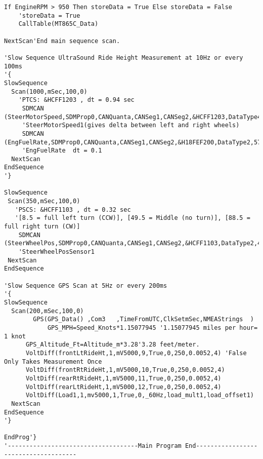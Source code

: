 \begin{lstlisting}[basicstyle=\tiny]
    If EngineRPM > 950 Then storeData = True Else storeData = False
    'storeData = True 
    CallTable(MT865C_Data)
      
NextScan'End main sequence scan.
		
'Slow Sequence UltraSound Ride Height Measurement at 10Hz or every 100ms
'{
SlowSequence
  Scan(1000,mSec,100,0)
    'PTCS: &HCFF1203 , dt = 0.94 sec
     SDMCAN (SteerMotorSpeed,SDMProp0,CANQuanta,CANSeg1,CANSeg2,&HCFF1203,DataType4,57,16,1,1,0) 
     'SteerMotorSpeed1(gives delta between left and right wheels)
     SDMCAN (EngFuelRate,SDMProp0,CANQuanta,CANSeg1,CANSeg2,&H18FEF200,DataType2,57,16,1,0.05,0)
     'EngFuelRate  dt = 0.1
  NextScan
EndSequence
'}

SlowSequence
 Scan(350,mSec,100,0)
   'PSCS: &HCFF1103 , dt = 0.32 sec 
   '[8.5 = full left turn (CCW)], [49.5 = Middle (no turn)], [88.5 = full right turn (CW)]
    SDMCAN (SteerWheelPos,SDMProp0,CANQuanta,CANSeg1,CANSeg2,&HCFF1103,DataType2,49,8,1,0.5,0)
    'SteerWheelPosSensor1
 NextScan
EndSequence

'Slow Sequence GPS Scan at 5Hz or every 200ms
'{		
SlowSequence
  Scan(200,mSec,100,0)
    	GPS(GPS_Data() ,Com3   ,TimeFromUTC,ClkSetmSec,NMEAStrings  )
			GPS_MPH=Speed_Knots*1.15077945 '1.15077945 miles per hour= 1 knot 
      GPS_Altitude_Ft=Altitude_m*3.28'3.28 feet/meter.
      VoltDiff(frontLtRideHt,1,mV5000,9,True,0,250,0.0052,4) 'False Only Takes Measurement Once
      VoltDiff(frontRtRideHt,1,mV5000,10,True,0,250,0.0052,4)
      VoltDiff(rearRtRideHt,1,mV5000,11,True,0,250,0.0052,4)
      VoltDiff(rearLtRideHt,1,mV5000,12,True,0,250,0.0052,4)
      VoltDiff(Load1,1,mv5000,1,True,0,_60Hz,load_mult1,load_offset1)        
  NextScan      
EndSequence
'}

EndProg'}
'------------------------------------Main Program End-------------------------------------
\end{lstlisting}